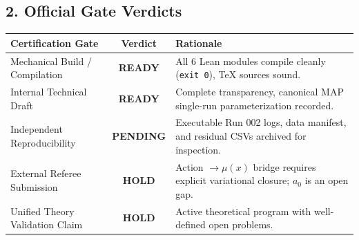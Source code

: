 \documentclass[10pt,letterpaper]{article}
\begin{document}
\vspace{0.2em}

\subsection*{2. Official Gate Verdicts}

\begin{center}
\footnotesize
\begin{tabularx}{\textwidth}{@{}l c X@{}}
\toprule
\textbf{Certification Gate} & \textbf{Verdict} & \textbf{Rationale} \\ \midrule
Mechanical Build / Compilation & \textbf{READY} & All 6 Lean modules compile cleanly (\texttt{exit 0}), TeX sources sound. \\
Internal Technical Draft & \textbf{READY} & Complete transparency, canonical MAP single-run parameterization recorded. \\
Independent Reproducibility & \textbf{PENDING} & Executable Run 002 logs, data manifest, and residual CSVs archived for inspection. \\
External Referee Submission & \textbf{HOLD} & Action $\to \mu(x)$ bridge requires explicit variational closure; $a_0$ is an open gap. \\
Unified Theory Validation Claim & \textbf{HOLD} & Active theoretical program with well-defined open problems. \\ \bottomrule
\end{tabularx}
\end{center}
\end{document}
